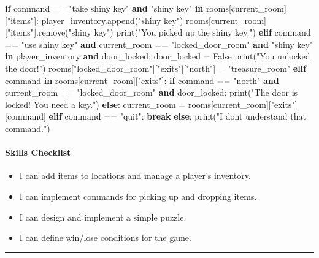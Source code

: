 \documentclass[
  justified,
  openright,
]{tufte-book}
\let\subsection\paragraph
\let\paragraph\paragraph
\newcommand{\KeywordTok}[1]{\textcolor{CodeKeyword}{\textbf{#1}}}  %
\newcommand{\StringTok}[1]{\textcolor{CodeString}{#1}}              %
\newcommand{\OperatorTok}[1]{\textcolor{DarkGray}{#1}}              %
\newenvironment{Shaded}{%
  \begin{mdframed}[style=TufteCode]%
}{%
  \end{mdframed}%
}
\let\subsection\paragraph
\let\paragraph\paragraph
\providecommand{\tightlist}{%
  \setlength{\itemsep}{0pt}\setlength{\parskip}{0pt}}
\begin{document}
\begin{Shaded}
\begin{Highlighting}[]
    \KeywordTok{if} command \OperatorTok{==} \StringTok{"take shiny key"} \KeywordTok{and} \StringTok{"shiny key"} \KeywordTok{in} rooms[current\_room][\StringTok{"items"}]:
        player\_inventory.append(\StringTok{"shiny key"})
        rooms[current\_room][\StringTok{"items"}].remove(\StringTok{"shiny key"})
        print(\StringTok{"You picked up the shiny key."})
    \KeywordTok{elif} command \OperatorTok{==} \StringTok{"use shiny key"} \KeywordTok{and} current\_room \OperatorTok{==} \StringTok{"locked\_door\_room"} \KeywordTok{and} \StringTok{"shiny key"} \KeywordTok{in} player\_inventory \KeywordTok{and} door\_locked:
        door\_locked \OperatorTok{=} False
        print(\StringTok{"You unlocked the door!"})
        rooms[\StringTok{"locked\_door\_room"}][\StringTok{"exits"}][\StringTok{"north"}] \OperatorTok{=} \StringTok{"treasure\_room"}
    \KeywordTok{elif} command \KeywordTok{in} rooms[current\_room][\StringTok{"exits"}]:
        \KeywordTok{if} command \OperatorTok{==} \StringTok{"north"} \KeywordTok{and} current\_room \OperatorTok{==} \StringTok{"locked\_door\_room"} \KeywordTok{and} door\_locked:
            print(\StringTok{"The door is locked! You need a key."})
        \KeywordTok{else}:
            current\_room \OperatorTok{=} rooms[current\_room][\StringTok{"exits"}][command]
    \KeywordTok{elif} command \OperatorTok{==} \StringTok{"quit"}:
        \KeywordTok{break}
    \KeywordTok{else}:
        print(\StringTok{"I don\textquotesingle{}t understand that command."})
\end{Highlighting}
\end{Shaded}

\subsection{Skills Checklist}\label{skills-checklist-49}

\begin{itemize}
\tightlist
\item[$\square$]
  I can add items to locations and manage a player's inventory.
\item[$\square$]
  I can implement commands for picking up and dropping items.
\item[$\square$]
  I can design and implement a simple puzzle.
\item[$\square$]
  I can define win/lose conditions for the game.
\end{itemize}

\begin{center}\rule{0.5\linewidth}{0.5pt}\end{center}
\end{document}

